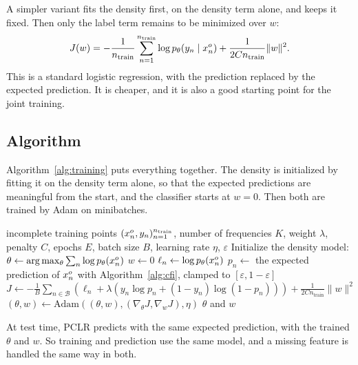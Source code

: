 A simpler variant fits the density first, on the density term alone, and keeps it fixed. Then only the label term remains to be
minimized over $w$:
\begin{equation}
  J(w) = -\frac{1}{n_\mathrm{train}} \sum_{n=1}^{n_\mathrm{train}} \log p_\theta(y_n \mid x^o_n) + \frac{1}{2 C n_\mathrm{train}} \lVert w \rVert^2 .
  \label{eq:marginal-likelihood}
\end{equation}
This is a standard logistic regression, with the prediction replaced by the expected prediction. It is cheaper, and it is also a good starting point for the joint training.

\subsection{Algorithm}
\label{subsec:training-algorithm}

Algorithm~\ref{alg:training} puts everything together. The density is initialized by fitting it on the density term alone, so that the
expected predictions are meaningful from the start, and the classifier starts at $w = 0$. Then both are trained by Adam on minibatches.

\begin{algorithm}[H]
\caption{Training PCLR}
\label{alg:training}
\begin{algorithmic}[1]
\Require incomplete training points $(x^o_n, y_n)_{n=1}^{n_\mathrm{train}}$, number of frequencies $K$, weight $\lambda$, penalty $C$, epochs $E$, batch size $B$, learning rate $\eta$, $\varepsilon$
\State Initialize the density model: $\theta \gets \arg\max_\theta \sum_{n} \log p_\theta(x^o_n)$
\State $w \gets 0$
      \State $\ell_n \gets \log p_\theta(x^o_n)$
      \State $p_n \gets$ the expected prediction of $x^o_n$ with Algorithm~\ref{alg:cfi}, clamped to $[\varepsilon, 1 - \varepsilon]$
    \EndFor
    \State $J \gets -\frac{1}{B} \sum_{n \in \mathcal{B}} \left( \ell_n + \lambda \left( y_n \log p_n + (1 - y_n) \log (1 - p_n) \right) \right) + \frac{1}{2 C n_\mathrm{train}} \lVert w \rVert^2$
    \State $(\theta, w) \gets \mathrm{Adam}\left((\theta, w), (\nabla_\theta J, \nabla_w J), \eta\right)$
  \EndFor
\EndFor
\State \Return $\theta$ and $w$
\end{algorithmic}
\end{algorithm}

At test time, PCLR predicts with the same expected prediction, with the trained $\theta$ and $w$. So training and prediction use the same
model, and a missing feature is handled the same way in both.

